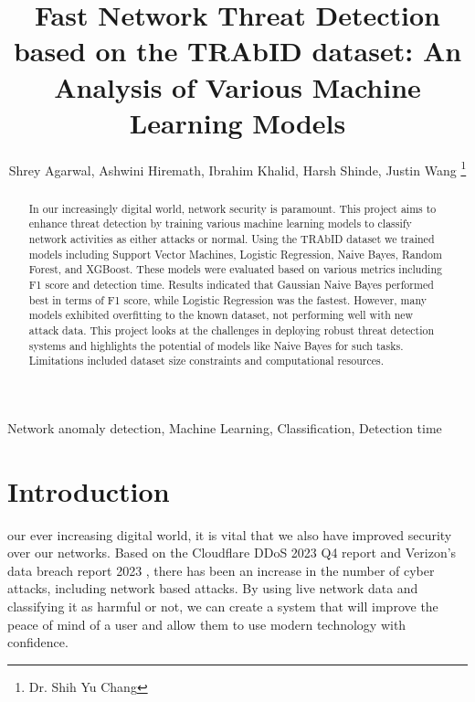 \documentclass[journal]{IEEEtran}
\begin{document}
\title{Fast Network Threat Detection based on the TRAbID dataset: An Analysis of Various Machine Learning Models }
\author{
Shrey Agarwal,
Ashwini Hiremath,
Ibrahim Khalid,
Harsh Shinde,
Justin Wang%
\thanks{Dr. Shih Yu Chang}
}


\maketitle



\begin{abstract}
In our increasingly digital world, network security is paramount. This project aims to enhance threat detection by training various machine learning models to classify network activities as either attacks or normal. Using the TRAbID dataset we trained models including Support Vector Machines, Logistic Regression, Naive Bayes, Random Forest, and XGBoost. These models were evaluated based on various metrics including F1 score and detection time. Results indicated that Gaussian Naive Bayes performed best in terms of F1 score, while Logistic Regression was the fastest. However, many models exhibited overfitting to the known dataset, not performing well with new attack data. This project looks at the challenges in deploying robust threat detection systems and highlights the potential of models like Naive Bayes for such tasks. Limitations included dataset size constraints and computational resources.
\end{abstract}

\begin{IEEEkeywords}
Network anomaly detection, Machine Learning, Classification, Detection time
\end{IEEEkeywords}

\IEEEpeerreviewmaketitle



\section{Introduction}

 our ever increasing digital world, it is vital that we also have improved security over our networks. Based on the Cloudflare DDoS 2023 Q4 report \cite{cloudflare} and Verizon’s data breach report 2023 \cite{verizion}, there has been an increase in the number of cyber attacks, including network based attacks. By using live network data and classifying it as harmful or not, we can create a system that will improve the peace of mind of a user and allow them to use modern technology with confidence.
\end{document}
